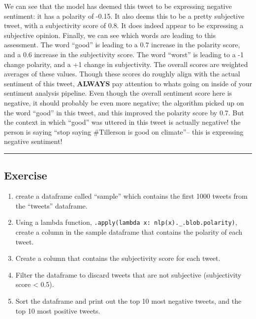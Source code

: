 \documentclass[
  letterpaper,
  DIV=11,
  numbers=noendperiod]{scrreprt}
\providecommand{\tightlist}{%
  \setlength{\itemsep}{0pt}\setlength{\parskip}{0pt}}\usepackage{longtable,booktabs,array}
\begin{document}
We can see that the model has deemed this tweet to be expressing
negative sentiment: it has a polarity of -0.15. It also deems this to be
a pretty subjective tweet, with a subjectivity score of 0.8. It does
indeed appear to be expressing a subjective opinion. Finally, we can see
which words are leading to this assessment. The word ``good'' is leading
to a 0.7 increase in the polarity score, and a 0.6 increase in the
subjectivity score. The word ``worst'' is leading to a -1 change
polarity, and a +1 change in subjectivity. The overall scores are
weighted averages of these values. Though these scores do roughly align
with the actual sentiment of this tweet, \textbf{ALWAYS} pay attention
to whats going on inside of your sentiment analysis pipeline. Even
though the overall sentiment score here is negative, it should probably
be even more negative; the algorithm picked up on the word ``good'' in
this tweet, and this improved the polarity score by 0.7. But the context
in which ``good'' was uttered in this tweet is actually negative! the
person is saying ``stop saying \#Tillerson is good on climate''-- this
is expressing negative sentiment!

\begin{center}\rule{0.5\linewidth}{0.5pt}\end{center}

\hypertarget{exercise-12}{%
\subsection{Exercise}\label{exercise-12}}

\begin{enumerate}
\def\labelenumi{\arabic{enumi}.}
\tightlist
\item
  create a dataframe called ``sample'' which contains the first 1000
  tweets from the ``tweets'' dataframe.
\item
  Using a lambda function,
  \texttt{.apply(lambda\ x:\ nlp(x).\_.blob.polarity)}, create a column
  in the sample dataframe that contains the polarity of each tweet.
\item
  Create a column that contains the subjectivity score for each tweet.
\item
  Filter the dataframe to discard tweets that are not subjective
  (subjectivity score \textless{} 0.5).
\item
  Sort the dataframe and print out the top 10 most negative tweets, and
  the top 10 most positive tweets.
\end{enumerate}
\end{document}
